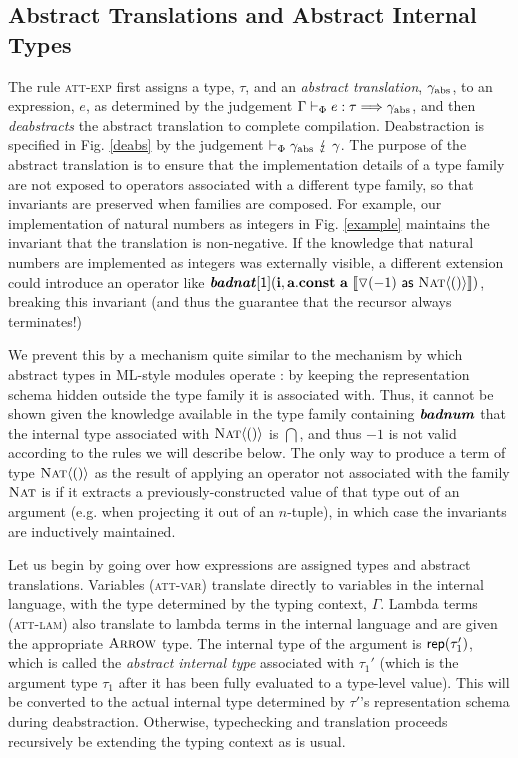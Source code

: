 \documentclass{llncs}
\begin{document}
\subsection{Abstract Translations and Abstract Internal Types}
The rule \textsc{att-exp} first assigns a type, $\tau$, and an \emph{abstract translation}, $\gamma_{\text{abs}}$, to an expression, $e$, as determined by the judgement $\Gamma \vdash_{\Phi} e : \tau \Longrightarrow \gamma_{\text{abs}}$, and then \emph{deabstracts} the abstract translation to complete compilation. Deabstraction is specified in Fig. \ref{deabs} by the judgement $\vdash_{\Phi} \gamma_{\text{abs}} ~\lightning~ \gamma$. The purpose of the abstract translation is to ensure that the implementation details of a type family are not exposed to operators associated with a different type family, so that invariants are preserved when families are composed. For example, our implementation of natural numbers as integers in Fig. \ref{example} maintains the invariant that the translation is non-negative. If the knowledge that natural numbers are implemented as integers was externally visible, a different extension could introduce an operator like $\textbf{\textit{badnat}}[\textsf{1}]({\textbf{i}},{\textbf{a}}.{\textbf{const}}~{\textbf{a}}~\llbracket \triangledown(-1)~{\sf as}~\textsc{Nat}\langle()\rangle \rrbracket)$, breaking this invariant (and thus the guarantee that the recursor always terminates!) 

We prevent this by a mechanism quite similar to the mechanism by which abstract types in ML-style modules operate \cite{atapl}: by keeping the representation schema hidden outside the type family it is associated with. Thus, it cannot be shown given the knowledge available in the type family containing $\textbf{\textit{badnum}}$ that the internal type associated with $\textsc{Nat}\langle()\rangle$ is $\dint$, and thus $-1$ is not valid according to the rules we will describe below. The only way to produce a term of type $\textsc{Nat}\langle()\rangle$ as the result of applying an operator not associated with the family $\textsc{Nat}$ is if it extracts a previously-constructed value of that type  out of an argument (e.g. when projecting it out of an $n$-tuple), in which case the invariants are inductively  maintained. %

Let us begin by going over how expressions are assigned types and abstract translations. Variables (\textsc{att-var}) translate directly to variables in the internal language, with the type determined by the typing context, $\Gamma$. Lambda terms (\textsc{att-lam}) also translate to lambda terms in the internal language and are given the appropriate $\textsc{Arrow}$ type. The internal type of the argument is ${\sf rep}(\tau_1')$, which is called the \emph{abstract internal type} associated with $\tau_1'$ (which is the argument type $\tau_1$ after it has been fully evaluated to a type-level value). This will be converted to the actual internal type determined by $\tau'$'s representation schema during deabstraction. Otherwise, typechecking and translation proceeds recursively be extending the typing context as is usual. 
\end{document}
